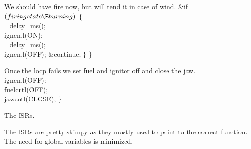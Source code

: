 We should have fire now, but will tend it in case of wind.
\Y\B\&{if} ${}(\\{firingstate}\E\\{burning}){}$\5
${}\{{}$\1\6
\\{\_delay\_ms}();\6
\\{igncntl}(\.{ON});\6
\\{\_delay\_ms}();\6
\\{igncntl}(\.{OFF});\6
\&{continue};\6
\4${}\}{}$\2\6
$\}{}$\par
\fi

Once the loop fails we set fuel and ignitor off and close the jaw.
\Y\B\\{igncntl}(\.{OFF});\6
\\{fuelcntl}(\.{OFF});\6
\\{jawcntl}(\.{CLOSE}); $\}{}$\par
\fi

The ISRs.

The ISRs are pretty skimpy as they mostly used to point 
to
the correct function.
The need for global variables is minimized.

\fi


